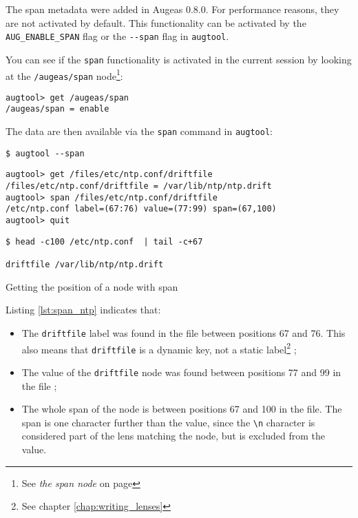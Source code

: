 \label{sec:locating_nodes}  

The span metadata were added in Augeas 0.8.0. For performance reasons, they are not activated by default. This functionality can be activated by the \verb!AUG_ENABLE_SPAN! flag or the \verb!--span! flag in \verb!augtool!.

You can see if the \verb!span! functionality is activated in the current session by looking at the \verb!/augeas/span! node\footnote{See \emph{the span node} on page \pageref{sec:span_node}}:


\begin{verbatim}
augtool> get /augeas/span
/augeas/span = enable
\end{verbatim}

The data are then available via the \verb!span! command in \verb!augtool!:


\begin{listing}
  \begin{verbatim}
$ augtool --span
  \end{verbatim}
  \begin{verbatim}
augtool> get /files/etc/ntp.conf/driftfile
/files/etc/ntp.conf/driftfile = /var/lib/ntp/ntp.drift
augtool> span /files/etc/ntp.conf/driftfile
/etc/ntp.conf label=(67:76) value=(77:99) span=(67,100)
augtool> quit
  \end{verbatim}
  \begin{verbatim}
$ head -c100 /etc/ntp.conf  | tail -c+67

driftfile /var/lib/ntp/ntp.drift
  \end{verbatim}
  \label{lst:span_ntp}
  \caption{Getting the position of a node with span}
\end{listing}

Listing \ref{lst:span_ntp} indicates that:

\begin{itemize}
\item
  The \verb!driftfile! label was found in the file between positions 67 and 76. This also means that \verb!driftfile! is a dynamic key, not a static label\footnote{See chapter \ref{chap:writing_lenses}} ;
\item
  The value of the \verb!driftfile! node was found between positions 77 and 99 in the file ;
\item
  The whole span of the node is between positions 67 and 100 in the file. The span is one character further than the value, since the \verb!\n! character is considered part of the lens matching the node, but is excluded from the value.
\end{itemize}
